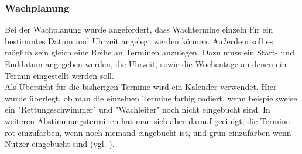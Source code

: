 \documentclass[fontsize=12pt,openright,oneside,paper=a4,BCOR=1cm]{scrbook}
\begin{document}
\subsubsection{Wachplanung}

Bei der Wachplanung wurde angefordert, dass Wachtermine einzeln für ein bestimmtes Datum und Uhrzeit angelegt werden können. Außerdem soll es möglich sein gleich eine Reihe an Terminen anzulegen. Dazu muss ein Start- und Enddatum angegeben werden, die Uhrzeit, sowie die Wochentage an denen ein Termin eingestellt werden soll. \\
Als Übersicht für die bisherigen Termine wird ein Kalender verwendet. Hier wurde überlegt, ob man die einzelnen Termine farbig codiert, wenn beispielsweise ein "Rettungsschwimmer" und "Wachleiter" noch nicht eingebucht sind. In weiteren Abstimmungsterminen hat man sich aber darauf geeinigt, die Termine rot einzufärben, wenn noch niemand eingebucht ist, und grün einzufärben wenn Nutzer eingebucht sind (vgl. \cite[S. 49]{sklar2011principles}).
\end{document}
